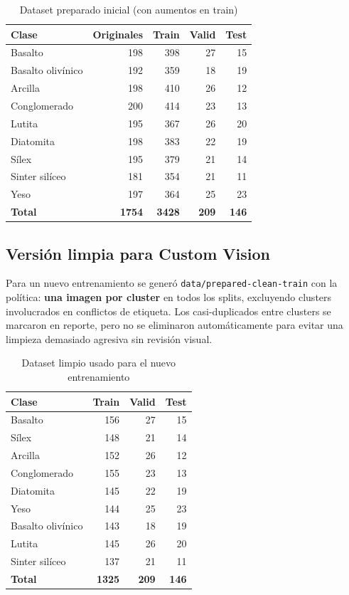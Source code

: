 \begin{table}[H]
  \centering
  \caption{Dataset preparado inicial (con aumentos en train)}
  \label{tab:dataset-prepared}
  \begin{tabular}{@{}lrrrr@{}}
    \toprule
    Clase & Originales & Train & Valid & Test \\
    \midrule
    Basalto & 198 & 398 & 27 & 15 \\
    Basalto olivínico & 192 & 359 & 18 & 19 \\
    Arcilla & 198 & 410 & 26 & 12 \\
    Conglomerado & 200 & 414 & 23 & 13 \\
    Lutita & 195 & 367 & 26 & 20 \\
    Diatomita & 198 & 383 & 22 & 19 \\
    Sílex & 195 & 379 & 21 & 14 \\
    Sinter silíceo & 181 & 354 & 21 & 11 \\
    Yeso & 197 & 364 & 25 & 23 \\
    \midrule
    \textbf{Total} & \textbf{1754} & \textbf{3428} & \textbf{209} & \textbf{146} \\
    \bottomrule
  \end{tabular}
\end{table}

\subsection{Versión limpia para Custom Vision}

Para un nuevo entrenamiento se generó \texttt{data/prepared-clean-train} con la
política: \textbf{una imagen por cluster} en todos los splits, excluyendo clusters
involucrados en conflictos de etiqueta. Los casi-duplicados entre clusters se
marcaron en reporte, pero no se eliminaron automáticamente para evitar una limpieza
demasiado agresiva sin revisión visual.

\begin{table}[H]
  \centering
  \caption{Dataset limpio usado para el nuevo entrenamiento}
  \label{tab:dataset-clean}
  \begin{tabular}{@{}lrrr@{}}
    \toprule
    Clase & Train & Valid & Test \\
    \midrule
    Basalto & 156 & 27 & 15 \\
    Sílex & 148 & 21 & 14 \\
    Arcilla & 152 & 26 & 12 \\
    Conglomerado & 155 & 23 & 13 \\
    Diatomita & 145 & 22 & 19 \\
    Yeso & 144 & 25 & 23 \\
    Basalto olivínico & 143 & 18 & 19 \\
    Lutita & 145 & 26 & 20 \\
    Sinter silíceo & 137 & 21 & 11 \\
    \midrule
    \textbf{Total} & \textbf{1325} & \textbf{209} & \textbf{146} \\
    \bottomrule
  \end{tabular}
\end{table}

